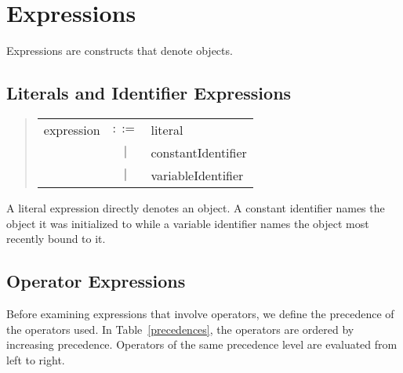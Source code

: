 \section{Expressions}
\label{expressions}
Expressions are \emd{} constructs that denote objects.

\subsection{Literals and Identifier Expressions}
\begin{quote}\it\begin{tabular}{lcl}
expression &$::=$& literal \\
    & $|$ & constantIdentifier \\
    & $|$ & variableIdentifier
\end{tabular}\end{quote}
A literal expression directly denotes an object.
A constant identifier names the object it was initialized to while a variable
identifier names the object most recently bound to it.

\subsection{Operator Expressions}
Before examining \emd{} expressions that involve operators, we define the
precedence of the operators used. In Table~\ref{precedences},
the operators are ordered by increasing
precedence.  Operators of the same
precedence level are evaluated from left to right.

